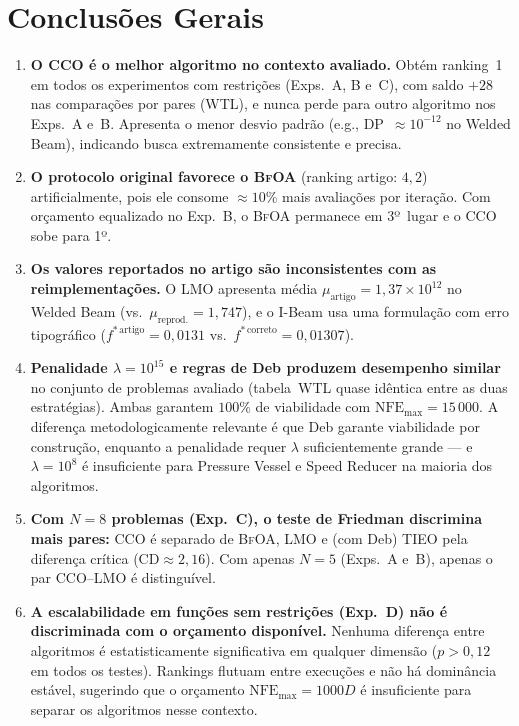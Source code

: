 \documentclass[12pt, a4paper]{article}
\newcommand{\alg}[1]{\textsc{#1}}
\newcommand{\nfe}{\mathrm{NFE}}
\begin{document}
\section{Conclusões Gerais}

\begin{enumerate}
  \item \textbf{O \alg{CCO} é o melhor algoritmo no contexto avaliado.}
    Obtém ranking~1 em todos os experimentos com restrições (Exps.~A,
    B e~C), com saldo $+28$ nas comparações por pares (WTL), e nunca
    perde para outro algoritmo nos Exps.~A e~B. Apresenta o menor
    desvio padrão (e.g., DP~$\approx 10^{-12}$ no Welded Beam),
    indicando busca extremamente consistente e precisa.

  \item \textbf{O protocolo original favorece o \alg{BfOA}} (ranking
    artigo: $4{,}2$) artificialmente, pois ele consome ${\approx}10\%$
    mais avaliações por iteração. Com orçamento equalizado no Exp.~B,
    o \alg{BfOA} permanece em 3º~lugar e o \alg{CCO} sobe para 1º.

  \item \textbf{Os valores reportados no artigo são inconsistentes
    com as reimplementações.} O \alg{LMO} apresenta média
    $\mu_{\text{artigo}} = 1{,}37\times10^{12}$ no Welded Beam
    (vs.\ $\mu_{\text{reprod.}} = 1{,}747$), e o I-Beam usa uma
    formulação com erro tipográfico ($f^{*\,\text{artigo}} = 0{,}0131$
    vs.\ $f^{*\,\text{correto}} = 0{,}01307$).

  \item \textbf{Penalidade $\lambda=10^{15}$ e regras de Deb produzem
    desempenho similar} no conjunto de problemas avaliado (tabela~WTL
    quase idêntica entre as duas estratégias). Ambas garantem $100\%$
    de viabilidade com $\nfe_{\max} = 15\,000$. A diferença
    metodologicamente relevante é que Deb garante viabilidade por
    construção, enquanto a penalidade requer $\lambda$ suficientemente
    grande — e $\lambda = 10^8$ é insuficiente para Pressure Vessel
    e Speed Reducer na maioria dos algoritmos.

  \item \textbf{Com $N=8$ problemas (Exp.~C), o teste de Friedman
    discrimina mais pares:} \alg{CCO} é separado de \alg{BfOA},
    \alg{LMO} e (com Deb) \alg{TIEO} pela diferença crítica
    ($\mathrm{CD} \approx 2{,}16$). Com apenas $N=5$ (Exps.~A e~B),
    apenas o par \alg{CCO}--\alg{LMO} é distinguível.

  \item \textbf{A escalabilidade em funções sem restrições (Exp.~D)
    não é discriminada com o orçamento disponível.} Nenhuma diferença
    entre algoritmos é estatisticamente significativa em qualquer
    dimensão ($p > 0{,}12$ em todos os testes). Rankings flutuam entre
    execuções e não há dominância estável, sugerindo que o orçamento
    $\nfe_{\max} = 1000D$ é insuficiente para separar os algoritmos
    nesse contexto.
\end{enumerate}
\end{document}
